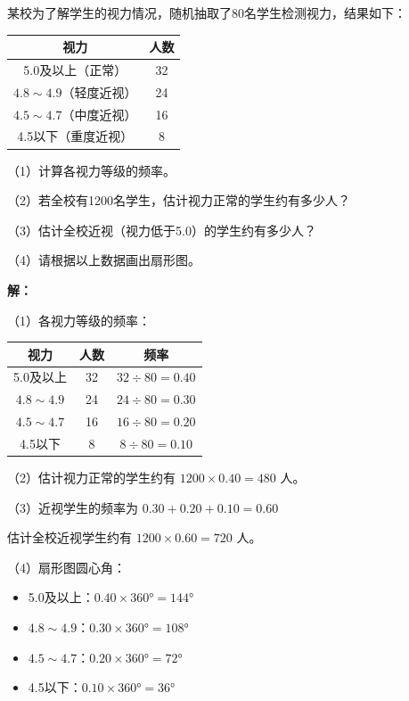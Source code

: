 \documentclass[12pt, a4paper]{ctexart}
\begin{document}
\begin{appbox}[【应用3】健康数据分析]
某校为了解学生的视力情况，随机抽取了80名学生检测视力，结果如下：

\begin{center}
\begin{tabular}{|c|c|}
\hline
视力 & 人数 \\
\hline
5.0及以上（正常） & 32 \\
\hline
$4.8 \sim 4.9$（轻度近视） & 24 \\
\hline
$4.5 \sim 4.7$（中度近视） & 16 \\
\hline
4.5以下（重度近视） & 8 \\
\hline
\end{tabular}
\end{center}

（1）计算各视力等级的频率。

（2）若全校有1200名学生，估计视力正常的学生约有多少人？

（3）估计全校近视（视力低于5.0）的学生约有多少人？

（4）请根据以上数据画出扇形图。

\textbf{解：}

（1）各视力等级的频率：

\begin{center}
\begin{tabular}{|c|c|c|}
\hline
视力 & 人数 & 频率 \\
\hline
5.0及以上 & 32 & $32 \div 80 = 0.40$ \\
\hline
$4.8 \sim 4.9$ & 24 & $24 \div 80 = 0.30$ \\
\hline
$4.5 \sim 4.7$ & 16 & $16 \div 80 = 0.20$ \\
\hline
4.5以下 & 8 & $8 \div 80 = 0.10$ \\
\hline
\end{tabular}
\end{center}

（2）估计视力正常的学生约有 $1200 \times 0.40 = 480$ 人。

（3）近视学生的频率为 $0.30 + 0.20 + 0.10 = 0.60$

估计全校近视学生约有 $1200 \times 0.60 = 720$ 人。

（4）扇形图圆心角：

\begin{itemize}[leftmargin=2em]
  \item 5.0及以上：$0.40 \times 360° = 144°$
  \item $4.8 \sim 4.9$：$0.30 \times 360° = 108°$
  \item $4.5 \sim 4.7$：$0.20 \times 360° = 72°$
  \item 4.5以下：$0.10 \times 360° = 36°$
\end{itemize}

\begin{center}
\end{center}
\end{appbox}
\end{document}
